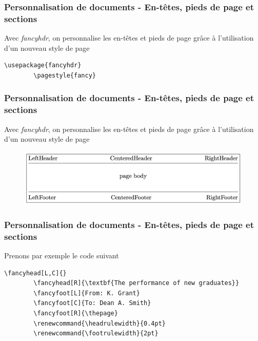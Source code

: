 \begin{frame}[fragile]
    \frametitle{Personnalisation de documents - En-têtes, pieds de page et sections}
    Avec \textcolor{hard_green}{\textit{fancyhdr}}\footnotemark, on personnalise les en-têtes et pieds de page grâce à l'utilisation d'un nouveau style de page
    \vfill
    \begin{lstlisting}[xleftmargin=1cm]
        \usepackage{fancyhdr}
        \pagestyle{fancy}
    \end{lstlisting}
\end{frame}

\begin{frame}[fragile]
    \frametitle{Personnalisation de documents - En-têtes, pieds de page et sections}
    Avec \textcolor{hard_green}{\textit{fancyhdr}}\footnotemark, on personnalise les en-têtes et pieds de page grâce à l'utilisation d'un nouveau style de page
    \vfill
    \begin{figure}
        \centering
            \includegraphics[scale=0.25]{./figures/fancyhdr.png}
            \label{fig: fancyhdr}
    \end{figure}
\end{frame}

\begin{frame}[fragile]
    \frametitle{Personnalisation de documents - En-têtes, pieds de page et sections}
    Prenons par exemple le code suivant
    \vfill
    \begin{lstlisting}[xleftmargin=-1.75cm]
        \fancyhead[L,C]{}
        \fancyhead[R]{\textbf{The performance of new graduates}}
        \fancyfoot[L]{From: K. Grant}
        \fancyfoot[C]{To: Dean A. Smith}
        \fancyfoot[R]{\thepage}
        \renewcommand{\headrulewidth}{0.4pt}
        \renewcommand{\footrulewidth}{2pt}
    \end{lstlisting}
    \vfill
\end{frame}

